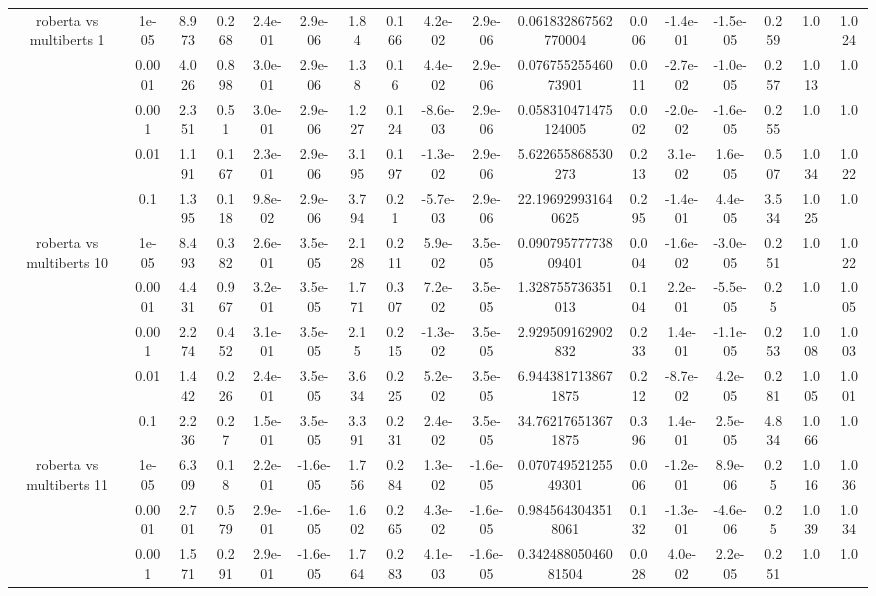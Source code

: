 \begin{tabular}{|c|c|c|c|c|c|c|c|c|c|c|c|c|c|c|c|c|}
\hline
\multirow{5}{*}{roberta  vs multiberts 1} & 1e-05 & 8.973 & 0.268 & 2.4e-01 & 2.9e-06 & 1.84 & 0.166 & 4.2e-02 & 2.9e-06 & 0.061832867562770004 & 0.006 & -1.4e-01 & -1.5e-05 & 0.259 & 1.0 & 1.024 \\
 & 0.0001 & 4.026 & 0.898 & 3.0e-01 & 2.9e-06 & 1.38 & 0.16 & 4.4e-02 & 2.9e-06 & 0.07675525546073901 & 0.011 & -2.7e-02 & -1.0e-05 & 0.257 & 1.013 & 1.0 \\
 & 0.001 & 2.351 & 0.51 & 3.0e-01 & 2.9e-06 & 1.227 & 0.124 & -8.6e-03 & 2.9e-06 & 0.058310471475124005 & 0.002 & -2.0e-02 & -1.6e-05 & 0.255 & 1.0 & 1.0 \\
 & 0.01 & 1.191 & 0.167 & 2.3e-01 & 2.9e-06 & 3.195 & 0.197 & -1.3e-02 & 2.9e-06 & 5.622655868530273 & 0.213 & 3.1e-02 & 1.6e-05 & 0.507 & 1.034 & 1.022 \\
 & 0.1 & 1.395 & 0.118 & 9.8e-02 & 2.9e-06 & 3.794 & 0.21 & -5.7e-03 & 2.9e-06 & 22.196929931640625 & 0.295 & -1.4e-01 & 4.4e-05 & 3.534 & 1.025 & 1.0 \\
\hline
\multirow{5}{*}{roberta  vs multiberts 10} & 1e-05 & 8.493 & 0.382 & 2.6e-01 & 3.5e-05 & 2.128 & 0.211 & 5.9e-02 & 3.5e-05 & 0.09079577773809401 & 0.004 & -1.6e-02 & -3.0e-05 & 0.251 & 1.0 & 1.022 \\
 & 0.0001 & 4.431 & 0.967 & 3.2e-01 & 3.5e-05 & 1.771 & 0.307 & 7.2e-02 & 3.5e-05 & 1.328755736351013 & 0.104 & 2.2e-01 & -5.5e-05 & 0.25 & 1.0 & 1.005 \\
 & 0.001 & 2.274 & 0.452 & 3.1e-01 & 3.5e-05 & 2.15 & 0.215 & -1.3e-02 & 3.5e-05 & 2.929509162902832 & 0.233 & 1.4e-01 & -1.1e-05 & 0.253 & 1.008 & 1.003 \\
 & 0.01 & 1.442 & 0.226 & 2.4e-01 & 3.5e-05 & 3.634 & 0.225 & 5.2e-02 & 3.5e-05 & 6.9443817138671875 & 0.212 & -8.7e-02 & 4.2e-05 & 0.281 & 1.005 & 1.001 \\
 & 0.1 & 2.236 & 0.27 & 1.5e-01 & 3.5e-05 & 3.391 & 0.231 & 2.4e-02 & 3.5e-05 & 34.762176513671875 & 0.396 & 1.4e-01 & 2.5e-05 & 4.834 & 1.066 & 1.0 \\
\hline
\multirow{5}{*}{roberta  vs multiberts 11} & 1e-05 & 6.309 & 0.18 & 2.2e-01 & -1.6e-05 & 1.756 & 0.284 & 1.3e-02 & -1.6e-05 & 0.07074952125549301 & 0.006 & -1.2e-01 & 8.9e-06 & 0.25 & 1.016 & 1.036 \\
 & 0.0001 & 2.701 & 0.579 & 2.9e-01 & -1.6e-05 & 1.602 & 0.265 & 4.3e-02 & -1.6e-05 & 0.9845643043518061 & 0.132 & -1.3e-01 & -4.6e-06 & 0.25 & 1.039 & 1.034 \\
 & 0.001 & 1.571 & 0.291 & 2.9e-01 & -1.6e-05 & 1.764 & 0.283 & 4.1e-03 & -1.6e-05 & 0.34248805046081504 & 0.028 & 4.0e-02 & 2.2e-05 & 0.251 & 1.0 & 1.0 \\

\end{tabular}
